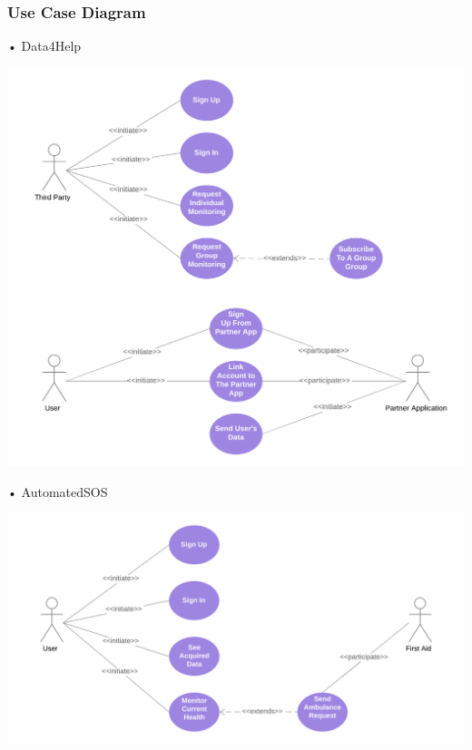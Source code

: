 \subsubsection{Use Case Diagram}
\begin{enumerate}
\begin{minipage}{\textwidth}
\FloatBarrier
\item[•]{\Large Data4Help}

\begin{center}
\includegraphics[scale=0.65]{Images/Data4HelpUseCaseDiagram.png}
\end{center}
\FloatBarrier
\end{minipage}


\begin{minipage}{\textwidth}
\item[•]{\Large AutomatedSOS}
\FloatBarrier
\begin{center}
\includegraphics[scale=0.65]{Images/AutomatedSOSCaseDiagram.png}
\end{center}
\FloatBarrier
\end{minipage}


\end{enumerate}
